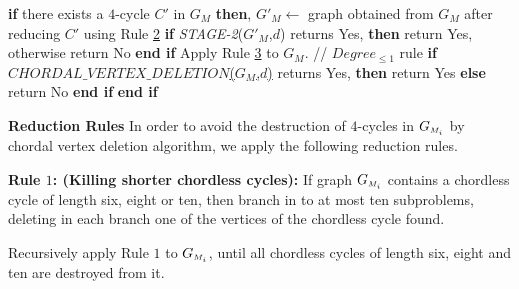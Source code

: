\documentclass[review, 1p]{elsarticle}
\begin{document}
\begin{algorithm}[h]
\begin{algorithmic}[1]
\State \indent \textbf{if} {there exists a $4$-cycle $C'$ in $G_{M}$} \textbf{then},  \vspace{-0.08 in}
\State \indent \indent $G'_{M} \leftarrow $  graph obtained from $G_{M}$ after reducing $C'$ using Rule \hyperref[presv]{2} \vspace{-0.08 in}
\State \indent \indent \textbf{if }\textit{STAGE-2}($G'_{M}$,$d$) returns Yes, \textbf{then} return Yes, otherwise return No\vspace{-0.08 in}
\State \indent   \textbf{end if}\vspace{-0.08 in}
\State \indent   Apply Rule \hyperref[presv] {3} to $G_{M}$.  // $Degree_{\leq 1}$ rule\vspace{-0.08 in}
\State \indent  \textbf{if} \hyperref[thmchrdl]{$CHORDAL\_VERTEX\_DELETION$($G_{M}$,$d$)} returns Yes, \textbf{then} \vspace{-0.05 in}
 \State \indent  \indent  return Yes\vspace{-0.1 in}
\State \indent  \textbf{ else}\vspace{-0.1 in}
 \State  \indent  \indent  return No\vspace{-0.1 in}
\State \indent  \textbf{end if}\vspace{-0.08 in}
\State \textbf{end if}\vspace{-0.05 in}
\end{algorithmic}
\end{algorithm}
\noindent \noindent \noindent \textbf{Reduction Rules \newline} \label{presv} 
In order to avoid the destruction of $4$-cycles in $G_{\mathsmaller M_{i}}$ by chordal vertex deletion algorithm, we apply the following reduction rules.

\noindent \textbf{Rule $1$: (Killing shorter chordless cycles):}\label{redtnrul1} If graph $G_{\mathsmaller M_{i}}$ contains a chordless cycle of length six, eight or ten, then branch in to at most ten subproblems, deleting in each branch one of the vertices of the chordless cycle found.

\noindent Recursively apply Rule $1$ to $G_{\mathsmaller M_{i}}$, until all chordless cycles of length six, eight and ten are destroyed from it.
 
\end{document}
